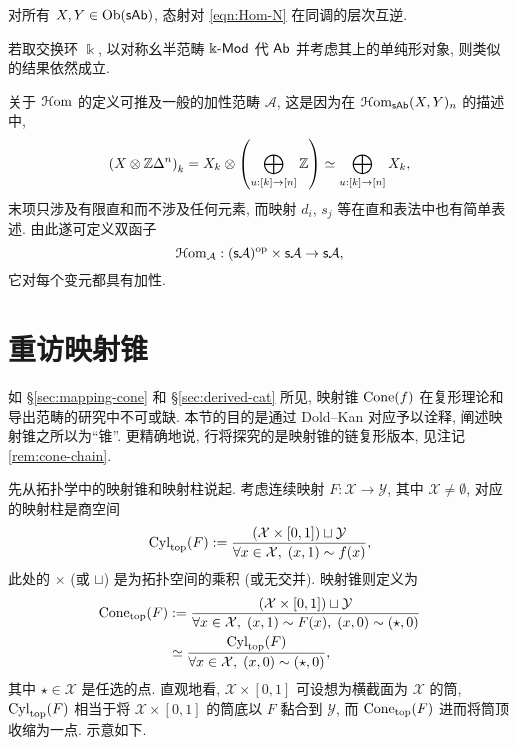 \begin{proposition}
	对所有 $X, Y \in \operatorname{Ob}(\mathsf{sAb})$, 态射对 \eqref{eqn:Hom-N} 在同调的层次互逆.
\end{proposition}

若取交换环 $\Bbbk$, 以对称幺半范畴 $\Bbbk\text{-}\mathsf{Mod}$ 代 $\mathsf{Ab}$ 并考虑其上的单纯形对象, 则类似的结果依然成立.

\begin{remark}
	关于 $\EuScript{H}\mathrm{om}$ 的定义可推及一般的加性范畴 $\mathcal{A}$, 这是因为在 $\EuScript{H}\mathrm{om}_{\mathsf{sAb}}(X, Y)_n$ 的描述中,
	\[ \left( X \otimes \mathbb{Z} \Delta^n\right)_k = X_k \otimes \left( \bigoplus_{u: [k] \to [n]} \mathbb{Z} \right) \simeq \bigoplus_{u: [k] \to [n]} X_k, \]
	末项只涉及有限直和而不涉及任何元素, 而映射 $d_i$, $s_j$ 等在直和表法中也有简单表述. 由此遂可定义双函子
	\[ \EuScript{H}\mathrm{om}_{\mathcal{A}}: (\mathsf{s}\mathcal{A})^{\operatorname{op}} \times \mathsf{s}\mathcal{A} \to \mathsf{s}\mathcal{A}, \]
	它对每个变元都具有加性.
\end{remark}

\section{重访映射锥}\label{sec:mapping-cone-revisited}
如 \S\ref{sec:mapping-cone} 和 \S\ref{sec:derived-cat} 所见, 映射锥 $\operatorname{Cone}(f)$ 在复形理论和导出范畴的研究中不可或缺. 本节的目的是通过 Dold--Kan 对应予以诠释, 阐述映射锥之所以为``锥''. 更精确地说, 行将探究的是映射锥的链复形版本, 见注记 \ref{rem:cone-chain}.

先从拓扑学中的映射锥和映射柱说起. 考虑连续映射 $F: \mathcal{X} \to \mathcal{Y}$, 其中 $\mathcal{X} \neq \emptyset$, 对应的映射柱是商空间
\begin{equation*}
	\operatorname{Cyl}_{\mathrm{top}}(F) := \dfrac{(\mathcal{X} \times [0, 1]) \sqcup \mathcal{Y}}{\forall x \in \mathcal{X}, \; (x, 1) \sim f(x)},
\end{equation*}
此处的 $\times$ (或 $\sqcup$) 是为拓扑空间的乘积 (或无交并). 映射锥则定义为
\begin{equation*}\begin{aligned}
	\operatorname{Cone}_{\mathrm{top}}(F) & := \dfrac{(\mathcal{X} \times [0, 1]) \sqcup \mathcal{Y}}{\forall x \in \mathcal{X}, \; (x, 1) \sim F(x), \; (x, 0) \sim (\star, 0)} \\
	& \simeq \dfrac{\operatorname{Cyl}_{\mathrm{top}}(F)}{\forall x \in \mathcal{X}, \; (x, 0) \sim (\star, 0)},
\end{aligned}\end{equation*}
其中 $\star \in \mathcal{X}$ 是任选的点. 直观地看, $\mathcal{X} \times [0,1]$ 可设想为横截面为 $\mathcal{X}$ 的筒, $\operatorname{Cyl}_{\mathrm{top}}(F)$ 相当于将 $\mathcal{X} \times [0, 1]$ 的筒底以 $F$ 黏合到 $\mathcal{Y}$, 而 $\operatorname{Cone}_{\mathrm{top}}(F)$ 进而将筒顶收缩为一点. 示意如下.

